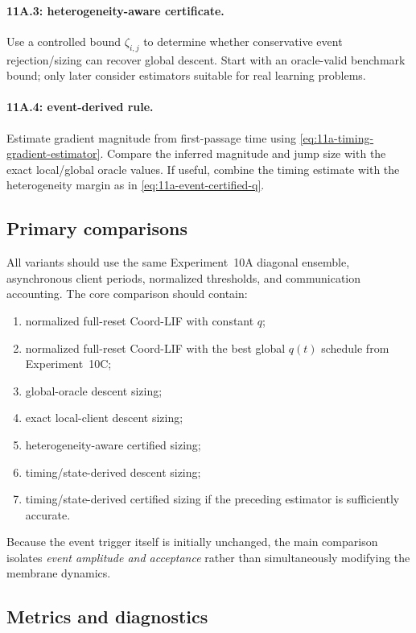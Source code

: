 \paragraph{11A.3: heterogeneity-aware certificate.}
Use a controlled bound $\zeta_{i,j}$ to determine whether conservative event rejection/sizing can recover global descent. Start with an oracle-valid benchmark bound; only later consider estimators suitable for real learning problems.

\paragraph{11A.4: event-derived rule.}
Estimate gradient magnitude from first-passage time using \cref{eq:11a-timing-gradient-estimator}. Compare the inferred magnitude and jump size with the exact local/global oracle values. If useful, combine the timing estimate with the heterogeneity margin as in \cref{eq:11a-event-certified-q}.

\subsection{Primary comparisons}

All variants should use the same Experiment~10A diagonal ensemble, asynchronous client periods, normalized thresholds, and communication accounting. The core comparison should contain:
\begin{enumerate}
  \item normalized full-reset Coord-LIF with constant $q$;
  \item normalized full-reset Coord-LIF with the best global $q(t)$ schedule from Experiment~10C;
  \item global-oracle descent sizing;
  \item exact local-client descent sizing;
  \item heterogeneity-aware certified sizing;
  \item timing/state-derived descent sizing;
  \item timing/state-derived certified sizing if the preceding estimator is sufficiently accurate.
\end{enumerate}
Because the event trigger itself is initially unchanged, the main comparison isolates \emph{event amplitude and acceptance} rather than simultaneously modifying the membrane dynamics.

\subsection{Metrics and diagnostics}


